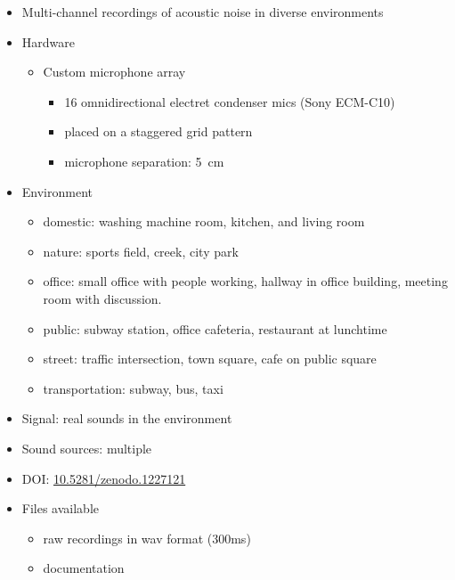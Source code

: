 \documentclass[14pt, legalpaper]{extarticle}
\begin{document}
\begin{itemize}

\item Multi-channel recordings of acoustic noise in diverse environments \cite{thiemann2013demand}

\item Hardware
	\begin{itemize}
	\item Custom microphone array
		\begin{itemize}
		\item 16 omnidirectional electret condenser mics (Sony ECM-C10) 
		\item placed on a staggered grid pattern 
		\item microphone separation: \SI{5}{\centi\metre}
		\end{itemize}
	\end{itemize}

\item Environment
	\begin{itemize}
	\item domestic: washing machine room, kitchen, and living room
	\item nature: sports field, creek, city park
	\item office: small office with people working, hallway in office building, meeting room with discussion.
	\item public: subway station, office cafeteria, restaurant at lunchtime
	\item street: traffic intersection, town square, cafe on public square
	\item transportation: subway, bus, taxi
	\end{itemize}

\item Signal: real sounds in the environment

\item Sound sources: multiple

\item DOI: \href{https://zenodo.org/record/1227121}{10.5281/zenodo.1227121} 

\item Files available
	\begin{itemize}
	\item raw recordings in wav format (300ms)
	\item documentation
	\end{itemize}

\end{itemize}
\end{document}
